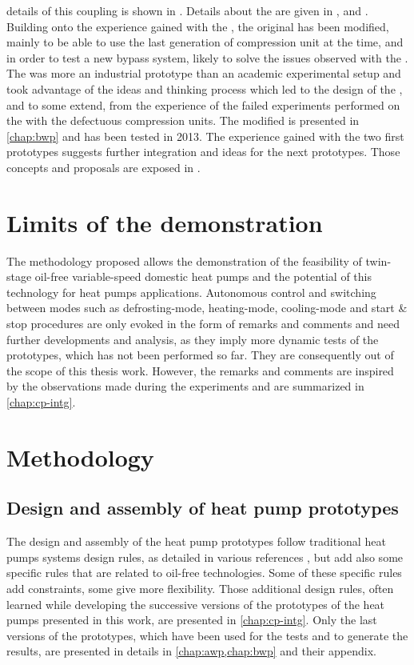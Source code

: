 details of this coupling is shown in . Details
about the \AWP{} are given in , and
. Building onto the experience gained with
the \AWP{}, the original \BWP{} has been modified, mainly to be able
to use the last generation of compression unit at the time, and in
order to test a new bypass system, likely to solve the issues observed
with the \AWP{}. The \AWP{} was more an industrial prototype than an
academic experimental setup and took advantage of the ideas and
thinking process which led to the design of the \BWP{}, and to some
extend, from the experience of the failed experiments performed on the
\BWP{} with the defectuous compression units. The modified \BWP{} is
presented in \cref{chap:bwp} and has been tested in 2013. The
experience gained with the two first prototypes suggests further
integration and ideas for the next prototypes. Those concepts and
proposals are exposed in .

\section{Limits of the demonstration}
\label{sec:methodo-limits}

The methodology proposed allows the demonstration of the feasibility
of twin-stage oil-free variable-speed domestic heat pumps and the
potential of this technology for heat pumps applications. Autonomous
control and switching between modes such as defrosting-mode,
heating-mode, cooling-mode and start \& stop procedures are only
evoked in the form of remarks and comments and need further
developments and analysis, as they imply more dynamic tests of the
prototypes, which has not been performed so far. They are consequently
out of the scope of this thesis work. However, the remarks and
comments are inspired by the observations made during the experiments
and are summarized in \cref{chap:cp-intg}.


\section{Methodology}
\label{sec:methodology}

\subsection{Design and assembly of heat pump prototypes}
\label{sec:methodo-design}

The design and assembly of the heat pump prototypes follow traditional
heat pumps systems design rules, as detailed in various references
\citep{rapin-desmons-2011a,Brown-1997a,Smith-Zappe-2004a,ASHRAE-HVACeq-2008a-HX,ASHRAE-HVACeq-2008a-Valves},
but add also some specific rules that are related to oil-free
technologies. Some of these specific rules add constraints, some give
more flexibility. Those additional design rules, often learned while
developing the successive versions of the prototypes of the heat pumps
presented in this work, are presented in \cref{chap:cp-intg}. Only the
last versions of the prototypes, which have been used for the tests
and to generate the results, are presented in details in
\cref{chap:awp,chap:bwp} and their appendix.

